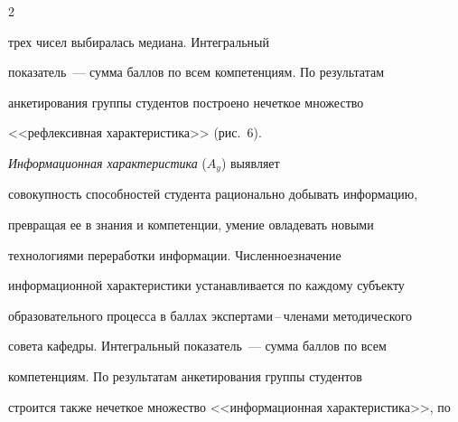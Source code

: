 \begin{multicols}{2}
\begin{figure}
\begin{center}
{ \epsfxsize=157.636mm




 }


  \end{center}


  \vspace*{-12pt}


  \begin{minipage}[t]{80mm}




\end{minipage}


\hfill


\begin{minipage}[t]{80mm}




\end{minipage}


\end{figure}


 трех чисел выбиралась медиана. Интегральный 


показатель~--- сумма баллов по всем компетенциям. По результатам 


анкетирования группы студентов построено нечеткое множество 


<<рефлексивная характеристика>> (рис.~6). 








     \textit{Информационная характеристика} ($A_y$) выявляет 


совокупность способностей студента рационально добывать информацию, 


превращая ее в знания и компетенции, умение овладевать новыми 


технологиями переработки информации. Численное\linebreak значение 


информационной характеристики устанавливается по каждому субъекту 


образовательного процесса в баллах экспертами\,--\,чле\-на\-ми методического 


совета кафедры. Интегральный показатель~--- сумма баллов по всем 


компетенциям. По результатам анкетирования группы студентов 


строится также  нечеткое множество <<информационная характеристика>>, по 



\end{multicols}
